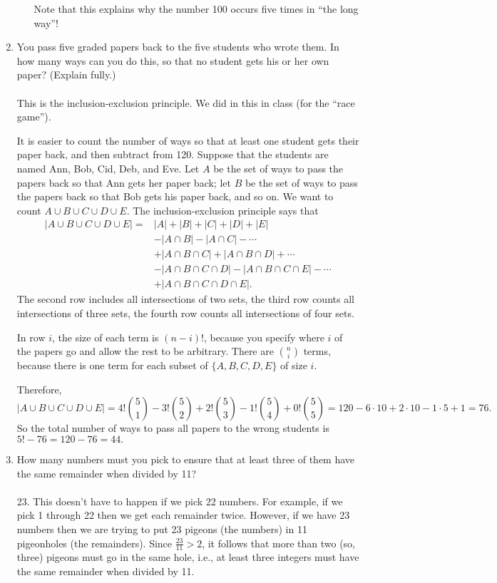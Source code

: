 \documentclass[12pt]{article}
\begin{document}
\begin{enumerate}[1.]
\begin{enumerate}[(a)]
Note that this explains why the number 100 occurs five times in ``the long way''!


\end{enumerate}

\item
You pass five graded papers back to the five students who wrote them. In how many ways can you do this, so that
no student gets his or her own paper? (Explain fully.)
\\
\\
This is the inclusion-exclusion principle. We did in this in class (for the ``race game''). 

It is easier to count the number of ways so that at least one student gets their paper back, and then subtract
from 120. Suppose that the students are named Ann, Bob, Cid, Deb, and Eve. Let $A$ be the set of ways to pass the
papers back so that Ann gets her paper back; let $B$ be the set of ways to pass the papers back so that Bob gets his
paper back, and so on. We want to count $A \cup B \cup C \cup D \cup E$. The inclusion-exclusion principle says that
\begin{align*}
|A \cup B \cup C \cup D \cup E| = & |A| + |B| + |C| + |D| + |E|
\\ & - |A \cap B| - |A \cap C| - \cdots
\\ & + |A \cap B \cap C| + |A \cap B \cap D| + \cdots
\\ & - |A \cap B \cap C \cap D| - |A \cap B \cap C \cap E| - \cdots
\\ & + |A \cap B \cap C \cap D \cap E|.
\end{align*}
The second row includes all intersections of two sets, the third row counts all intersections of three sets, the fourth row
counts all intersections of four sets.

In row $i$, the size of each term is $(n - i)!$, because you specify where $i$ of the papers go and allow the rest to be
arbitrary. There are ${n \choose i}$ terms, because there is one term for each subset of $\{A, B, C, D, E\}$ of size $i$.

Therefore,
$$|A \cup B \cup C \cup D \cup E| = 4! {5 \choose 1} - 3! {5 \choose 2} + 2! {5 \choose 3} - 1! {5 \choose 4} + 0! {5 \choose 5}
= 120 - 6 \cdot 10 + 2 \cdot 10 - 1 \cdot 5 + 1 = 76.$$
So the total number of ways to pass all papers to the wrong students is $5! - 76 = 120 - 76 = 44.$

\item
How many numbers must you pick to ensure that at least three of them have the same remainder when divided by 11?
\\
\\
23. This doesn't have to happen if we pick 22 numbers. For example, if we pick 1 through 22 then we get each remainder
twice. However, if we have 23 numbers then we are trying to put 23 pigeons (the numbers) in 11 pigeonholes (the remainders).
Since $\frac{23}{11} > 2$, it follows that more than two (so, three) pigeons must go in the same hole, i.e., at least three
integers must have the same remainder when divided by 11.


\end{enumerate}
\end{document}
